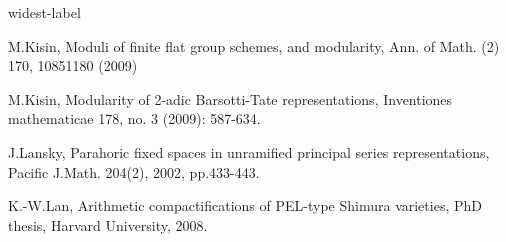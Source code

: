 \documentclass[12pt,oneside,reqno]{amsart}
\theoremstyle{plain}
\begin{document}
\begin{thebibliography}{widest-label}
		
		
		
		
		
		
		
		
		
		
		
		
		
		
		
		
		
		
		
		
		
		
		
		M.Kisin,
		Moduli of finite flat group schemes, and modularity,
		Ann. of Math. (2) 170, 10851180 (2009)
		
		
		
		M.Kisin,
		Modularity of 2-adic Barsotti-Tate representations,
		Inventiones mathematicae 178, no. 3 (2009): 587-634.
		
		
		
		
		J.Lansky,
		Parahoric fixed spaces in unramified principal series representations,
		Pacific J.Math.
		204(2),
		2002,
		pp.433-443.
		
		
		
		
		
		K.-W.Lan,
		Arithmetic compactifications of PEL-type Shimura varieties, PhD thesis,
		Harvard University, 2008.
		

\end{thebibliography}
\end{document}
